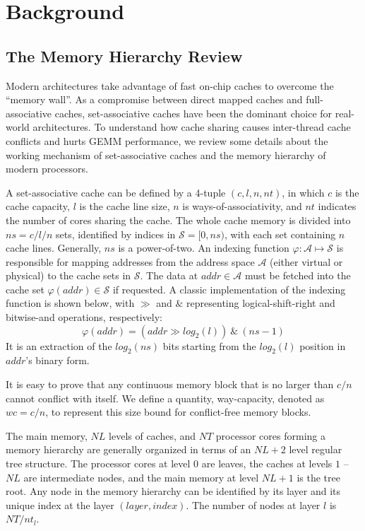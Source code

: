 \section{Background}\label{sec:background}

\subsection{The Memory Hierarchy Review}\label{subsec:hierarchy}

Modern architectures take advantage of fast on-chip caches
to overcome the ``memory wall''.
As a compromise between direct mapped caches
and full-associative caches,
set-associative caches have been the dominant choice for real-world architectures.
To understand how cache sharing causes
inter-thread cache conflicts
and hurts GEMM performance, we review some details
about the working mechanism of set-associative caches and
the memory hierarchy of modern processors.

A set-associative cache can be defined by a 4-tuple $(c, l, n, nt)$,
in which $c$ is the cache capacity, $l$ is the cache line size,
$n$ is ways-of-associativity,
and $nt$ indicates the number of cores sharing the cache.
The whole cache memory is divided into $ns=c/l/n$ sets,
identified by indices in $\mathcal{S} = [0, ns)$,
with each set containing $n$ cache lines.
Generally, $ns$ is a power-of-two.
An indexing function $\varphi: \mathcal{A} \mapsto \mathcal{S}$ is responsible for
mapping addresses from the address space $\mathcal{A}$
(either virtual or physical) to the cache sets in
$\mathcal{S}$.
The data at $addr \in \mathcal{A}$ must be fetched
into the cache set $\varphi(addr) \in \mathcal{S}$ if requested.
A classic implementation of the indexing function is shown below,
with $\gg$ and $\&$ representing logical-shift-right and bitwise-and operations, respectively:
\begin{equation*}
  \varphi(addr) = (addr \gg log_2(l)) ~\&~ (ns-1)
  \label{eq:phi}
\end{equation*}
It is an extraction of the $log_2(ns)$ bits starting from the $log_2(l)$
position in $addr$'s binary form.

It is easy to prove that any continuous memory block
that is no larger than $c/n$
cannot conflict with itself.
We define a quantity, way-capacity, denoted as $wc=c/n$,
to represent this size bound for conflict-free memory blocks.

The main memory, $NL$ levels of caches, and $NT$ processor cores
forming a memory hierarchy are generally organized in terms
of an $NL+2$ level regular tree structure.
The processor cores at level $0$ are leaves,
the caches at levels $1$ -- $NL$ are intermediate nodes,
and the main memory at level $NL+1$ is the tree root.
Any node in the memory hierarchy can be identified by
its layer and its unique index at the layer $(layer, index)$.
The number of nodes at layer $l$ is $NT / nt_l$.

